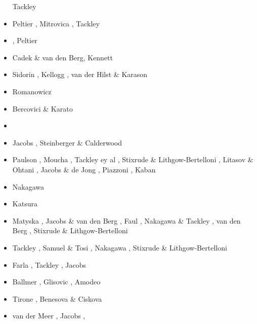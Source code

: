 \begin{scriptsize}
\begin{itemize}
                     Tackley \cite{tack95}
\item[\nineteenninetysix] Peltier \cite{pelt96}, Mitrovica \cite{mitr96}, Tackley \cite{tack96b}
\item[\nineteenninetyseven] \cite{mifo97}, Peltier \etal \cite{pebs97}
\item[\nineteenninetyeight] Cadek \& van den Berg\cite{cava98}, Kennett \cite{kenn98}
\item[\nineteenninetynine] Sidorin \etal \cite{sigh99}, Kellogg \etal \cite{kehv99}, 
                     van der Hilst \& Karason \cite{vaka99}
\item[\twothousandone] Romanowicz \cite{roma01}
\item[\twothousandthree] Bercovici \& Karato \cite{beka03} 
\item[\twothousandfive] \cite{hett05}\cite{nata05b}\cite{nabu05}\cite{stli05}\cite{stli05b}
\item[\twothousandsix] Jacobs \etal \cite{javd06}, Steinberger \& Calderwood \cite{stca06}
\item[\twothousandseven] Paulson \etal \cite{pazw07}, Moucha \etal \cite{mofm07}, 
                   Tackley ey al \cite{tanh07}, Stixrude \& Lithgow-Bertelloni \cite{stli07}, 
                   Litasov \& Ohtani \cite{lioh07}, Jacobs \& de Jong \cite{jade07},
                   Piazzoni \etal \cite{pisb07}, Kaban \etal \cite{kart07}
\item[\twothousandnine] Nakagawa \etal \cite{natd09}
\item[\twothousandten] Katsura \etal \cite{kayy10}
\item[\twothousandeleven] Matyska \etal \cite{mayw11}, Jacobs \& van den Berg \cite{java11}, 
                    Faul \etal \cite{faff11}, Nakagawa \& Tackley \cite{nata11}, 
                    van den Berg \etal \cite{vayj11}, Stixrude \& Lithgow-Bertelloni \cite{stli11}
\item[\twothousandtwelve] Tackley \cite{tack12}, Samuel \& Tosi \cite{sato12}, 
                    Nakagawa \etal \cite{natd12}, Stixrude \& Lithgow-Bertelloni \cite{stli12}
\item[\twothousandthirteen] Farla \etal \cite{fakc13}, Tackley \etal \cite{taab13}, Jacobs \etal \cite{jasv13}
\item[\twothousandfifteen] Ballmer \etal \cite{basn15}, Glisovic \etal \cite{glfa15}, Amodeo \etal \cite{amsb15}
\item[\twothousandsixteen] Tirone \cite{tiro16}, Benesova \& Ciskova \cite{beci16}
\item[\twothousandseventeen] van der Meer \etal \cite{vavs17}, Jacobs \etal \cite{jasv17}, 

\end{itemize}
\end{scriptsize}
